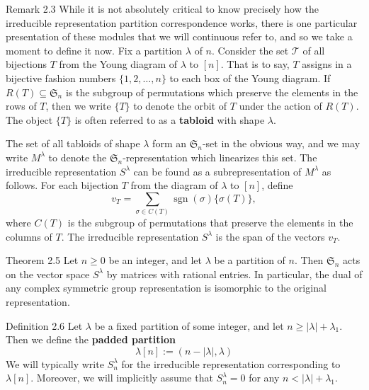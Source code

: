 \begin{sourceblockroman}{Remark 2.3}
While it is not absolutely critical to know precisely how the irreducible representation partition correspondence works, there is one particular presentation of these modules that we will continuous refer to, and so we take a moment to define it now. Fix a partition $\lambda$ of $n$. Consider the set $\mathcal{T}$ of all bijections $T$ from the Young diagram of $\lambda$ to $[n]$. That is to say, $T$ assigns in a bijective fashion numbers $\{1,2,\ldots,n\}$ to each box of the Young diagram. If $R(T)\subseteq\mathfrak{S}_n$ is the subgroup of permutations which preserve the elements in the rows of $T$, then we write $\{T\}$ to denote the orbit of $T$ under the action of $R(T)$. The object $\{T\}$ is often referred to as a \textbf{tabloid} with shape $\lambda$.

The set of all tabloids of shape $\lambda$ form an $\mathfrak{S}_n$-set in the obvious way, and we may write $M^\lambda$ to denote the $\mathfrak{S}_n$-representation which linearizes this set. The irreducible representation $S^\lambda$ can be found as a subrepresentation of $M^\lambda$ as follows. For each bijection $T$ from the diagram of $\lambda$ to $[n]$, define
\[
 v_T=\sum_{\sigma\in C(T)}\operatorname{sgn}(\sigma)\{\sigma(T)\},
\]
where $C(T)$ is the subgroup of permutations that preserve the elements in the columns of $T$. The irreducible representation $S^\lambda$ is the span of the vectors $v_T$.
\end{sourceblockroman}

\begin{sourceblock}{Theorem 2.5}
Let $n\geq 0$ be an integer, and let $\lambda$ be a partition of $n$. Then $\mathfrak{S}_n$ acts on the vector space $S^\lambda$ by matrices with rational entries. In particular, the dual of any complex symmetric group representation is isomorphic to the original representation.
\end{sourceblock}

\begin{sourceblock}{Definition 2.6}
Let $\lambda$ be a fixed partition of some integer, and let $n\geq |\lambda|+\lambda_1$. Then we define the \textbf{padded partition}
\[
 \lambda[n]:=(n-|\lambda|,\lambda)
\]
We will typically write $S_n^\lambda$ for the irreducible representation corresponding to $\lambda[n]$. Moreover, we will implicitly assume that $S_n^\lambda=0$ for any $n<|\lambda|+\lambda_1$.
\end{sourceblock}

